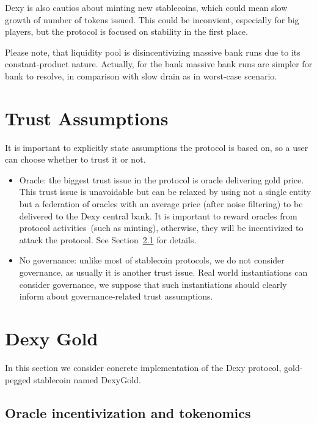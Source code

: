 \documentclass{article}   %
\newcommand{\sct}{stablecoin}
\newcommand{\dx}{Dexy}
\newcommand{\dxg}{DexyGold}
\begin{document}
\dx{} is also cautios about minting new \sct{}s, which could mean slow growth of number of tokens issued. This could be inconvient, especially for big players, but the protocol is focused on stability in the first place. 

Please note, that liquidity pool is disincentivizing massive bank runs due to its constant-product nature. Actually, for the bank massive bank runs are simpler for bank to resolve, in comparison with slow drain as in worst-case scenario. 


\section{Trust Assumptions}
\label{kya}

It is important to explicitly state assumptions the protocol is based on, so a user can choose whether to trust it or not.

\begin{itemize}
  \item{Oracle: } the biggest trust issue in the protocol is oracle delivering gold price. This trust issue is unavoidable but can be relaxed by using not a single entity but a federation of oracles with an average price (after noise filtering) to be delivered to the Dexy central bank.
  It is important to reward oracles from protocol activities~(such as minting), otherwise, they will be incentivized to attack the protocol. See Section~\ref{oracle-incentivization} for details.

  \item{No governance: } unlike most of stablecoin protocols, we do not consider governance, as usually it is another trust issue. Real world instantiations can consider governance, we suppose that such instantiations should clearly inform about governance-related trust assumptions.
\end{itemize}

\section{Dexy Gold}
\label{dexygold}

In this section we consider concrete implementation of the \dx{} protocol, gold-pegged stablecoin named \dxg{}.

\subsection{Oracle incentivization and tokenomics}
\label{oracle-incentivization}
\end{document}
